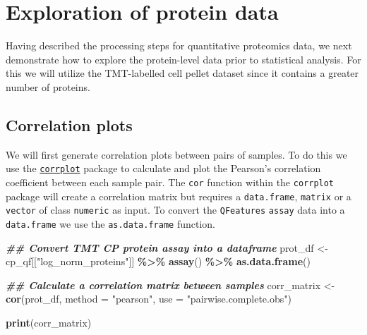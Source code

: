 \documentclass[9pt,a4paper,]{extarticle}
\newenvironment{Shaded}{\begin{snugshade}}{\end{snugshade}}
\newcommand{\AttributeTok}[1]{\textcolor[rgb]{0.13,0.29,0.53}{#1}}
\newcommand{\DocumentationTok}[1]{\textcolor[rgb]{0.56,0.35,0.01}{\textbf{\textit{#1}}}}
\newcommand{\FunctionTok}[1]{\textcolor[rgb]{0.13,0.29,0.53}{\textbf{#1}}}
\newcommand{\NormalTok}[1]{#1}
\newcommand{\OtherTok}[1]{\textcolor[rgb]{0.56,0.35,0.01}{#1}}
\newcommand{\SpecialCharTok}[1]{\textcolor[rgb]{0.81,0.36,0.00}{\textbf{#1}}}
\newcommand{\StringTok}[1]{\textcolor[rgb]{0.31,0.60,0.02}{#1}}
\begin{document}
\hypertarget{exploration-of-protein-data}{%
\section{Exploration of protein data}\label{exploration-of-protein-data}}

Having described the processing steps for quantitative proteomics data, we next
demonstrate how to explore the protein-level data prior to statistical analysis.
For this we will utilize the TMT-labelled cell pellet dataset since it contains
a greater number of proteins.

\hypertarget{correlation-plots}{%
\subsection{Correlation plots}\label{correlation-plots}}

We will first generate correlation plots between pairs of samples. To do this we
use the \href{https://cran.r-project.org/web/packages/corrplot/vignettes/corrplot-intro.html}{\texttt{corrplot}}
package to calculate and plot the Pearson's correlation coefficient between each
sample pair. The \texttt{cor} function within the \texttt{corrplot} package will create a
correlation matrix but requires a \texttt{data.frame}, \texttt{matrix} or a \texttt{vector} of class
\texttt{numeric} as input. To convert the \texttt{QFeatures} \texttt{assay} data into a \texttt{data.frame}
we use the \texttt{as.data.frame} function.

\begin{Shaded}
\begin{Highlighting}[]
\DocumentationTok{\#\# Convert TMT CP protein assay into a dataframe}
\NormalTok{prot\_df }\OtherTok{\textless{}{-}}\NormalTok{ cp\_qf[[}\StringTok{"log\_norm\_proteins"}\NormalTok{]] }\SpecialCharTok{\%\textgreater{}\%}
  \FunctionTok{assay}\NormalTok{() }\SpecialCharTok{\%\textgreater{}\%}
  \FunctionTok{as.data.frame}\NormalTok{()}

\DocumentationTok{\#\# Calculate a correlation matrix between samples}
\NormalTok{corr\_matrix }\OtherTok{\textless{}{-}} \FunctionTok{cor}\NormalTok{(prot\_df,}
                   \AttributeTok{method =} \StringTok{"pearson"}\NormalTok{,}
                   \AttributeTok{use =} \StringTok{"pairwise.complete.obs"}\NormalTok{)}

\FunctionTok{print}\NormalTok{(corr\_matrix)}
\end{Highlighting}
\end{Shaded}
\end{document}
